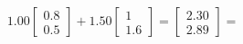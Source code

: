 \documentclass[preview]{standalone}
\begin{document}
\begin{align*}
1.00 \begin{bmatrix} 0.8 \\ 0.5 \end{bmatrix} + 1.50 \begin{bmatrix} 1 \\ 1.6 \end{bmatrix} = \begin{bmatrix} 2.30 \\ 2.89 \end{bmatrix} =
\end{align*}
\end{document}
